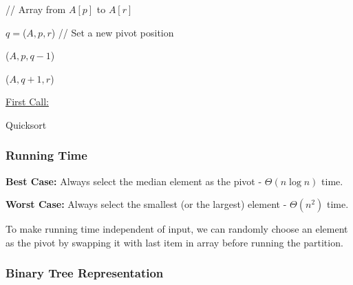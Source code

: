 \documentclass[10pt]{article}
\begin{document}
\begin{algorithm}
	\SetAlgoLined
	 // Array from $A[p]$ to $A[r]$ {
		
	
		$q = $\Partition($A, p, r$) // Set a new pivot position
		
		\Quicksort($A, p, q-1$)
		
		\Quicksort($A, q+1, r$)
		
		\underline{First Call:} 
		
	}
		
	\vspace{1em}
	
	
	\caption{Quicksort}
\end{algorithm}

\newpage

\subsubsection{Running Time}

\textbf{Best Case:} Always select the median element as the pivot - $\Theta(n\log n)$ time.

\textbf{Worst Case:} Always select the smallest (or the largest) element - $\Theta(n^2)$ time.

To make running time independent of input, we can randomly choose an element as the pivot by swapping it with last item in array before running the partition.

\subsubsection{Binary Tree Representation}
\end{document}
